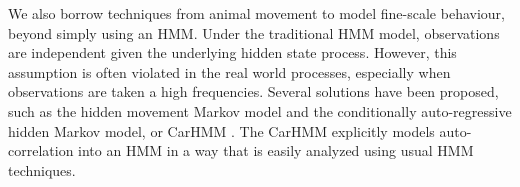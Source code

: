 %


We also borrow techniques from animal movement to model fine-scale behaviour, beyond simply using an HMM.  
Under the traditional HMM model,  observations are independent given  the underlying hidden state process.
However, this assumption is often violated in the real world processes, especially when observations are taken a high frequencies. 
Several solutions have been proposed, such as  the hidden movement Markov model \citep{Whoriskey:2016} and the conditionally auto-regressive hidden Markov model, or CarHMM \citep{Lawler:2019}. 
The CarHMM  explicitly models auto-correlation into an HMM in a way that is easily analyzed using usual HMM techniques.

